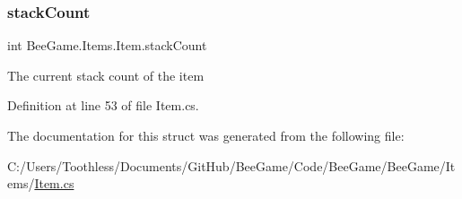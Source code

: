 \subsubsection{\texorpdfstring{stack\+Count}{stackCount}}
{\footnotesize\ttfamily int Bee\+Game.\+Items.\+Item.\+stack\+Count}



The current stack count of the item 



Definition at line 53 of file Item.\+cs.



The documentation for this struct was generated from the following file\+:\begin{DoxyCompactItemize}
\item 
C\+:/\+Users/\+Toothless/\+Documents/\+Git\+Hub/\+Bee\+Game/\+Code/\+Bee\+Game/\+Bee\+Game/\+Items/\hyperlink{_item_8cs}{Item.\+cs}\end{DoxyCompactItemize}
